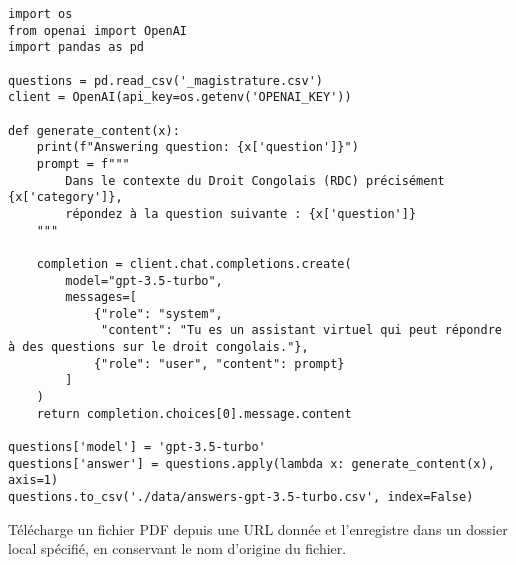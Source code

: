 \begin{listing}[!ht]
\begin{verbatim}
import os
from openai import OpenAI
import pandas as pd

questions = pd.read_csv('_magistrature.csv')
client = OpenAI(api_key=os.getenv('OPENAI_KEY'))

def generate_content(x):
    print(f"Answering question: {x['question']}")
    prompt = f"""
        Dans le contexte du Droit Congolais (RDC) précisément {x['category']},
        répondez à la question suivante : {x['question']}
    """

    completion = client.chat.completions.create(
        model="gpt-3.5-turbo",
        messages=[
            {"role": "system",
             "content": "Tu es un assistant virtuel qui peut répondre à des questions sur le droit congolais."},
            {"role": "user", "content": prompt}
        ]
    )
    return completion.choices[0].message.content

questions['model'] = 'gpt-3.5-turbo'
questions['answer'] = questions.apply(lambda x: generate_content(x), axis=1)
questions.to_csv('./data/answers-gpt-3.5-turbo.csv', index=False)
\end{verbatim}
\caption{Télécharge un fichier PDF depuis une URL donnée et l'enregistre dans un dossier local spécifié, en conservant le nom d'origine du fichier.}
\label{appendix:code:python:gpt-3-evaluation}
\end{listing}